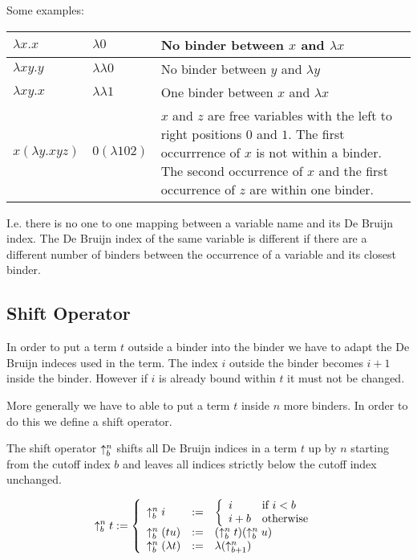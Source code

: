\documentclass[12pt]{article}
\begin{document}
Some examples:

\begin{tabular}[t]{|l|l|p{7cm}|}
    \hline
    $\lambda x . x$
    &
    $\lambda 0$
    &
    No binder between $x$ and $\lambda x$
    \\
    \hline
    $\lambda x y. y$
    &
    $\lambda \lambda 0$
    &
    No binder between $y$ and $\lambda y$
    \\
    \hline
    $\lambda x y. x$
    &
    $\lambda \lambda 1$
    &
    One binder between $x$ and $\lambda x$
    \\
    \hline
    $x (\lambda y . x y z)$
    &
    $0 (\lambda 1 0 2)$
    &
    $x$ and $z$ are free variables with the left to right positions $0$ and $1$.
    The first occurrrence of $x$ is not within a binder. The second occurrence
    of $x$ and the first occurrence of $z$ are within one binder.
    \\
    \hline
\end{tabular}

I.e. there is no one to one mapping between a variable name and its De Bruijn
index. The De Bruijn index of the same variable is different if there are a
different number of binders between the occurrence of a variable and its closest
binder.






\subsection{Shift Operator}

In order to put a term $t$ outside a binder into the binder we
have to adapt the De Bruijn indeces used in the term. The index $i$ outside the
binder becomes $i+1$ inside the binder. However if $i$ is already bound within
$t$ it must not be changed.

More generally we have to able to put a term $t$ inside $n$ more binders. In
order to do this we define a shift operator.

The
shift operator $\uparrow^n_b$ shifts all De Bruijn indices in a term $t$ up
by $n$ starting from the cutoff index $b$ and leaves all indices strictly below
the cutoff index unchanged.

$$
    \uparrow^n_b t := 
    \left\{ \begin{array}{lllll} 
        \uparrow^n_b i&:=&
        \left\{ \begin{array}{lllll} 
            i & \text{if } i < b
            \\
            i + b & \text{otherwise}
         \end{array} \right.
        \\
        \uparrow^n_b (t u)
        &:=&
        (\uparrow^n_b t)
        (\uparrow^n_b u)
        \\
        \uparrow^n_b (\lambda t)
        &:=&
        \lambda (\uparrow^n_{b+1})
     \end{array} \right.
$$
\end{document}
